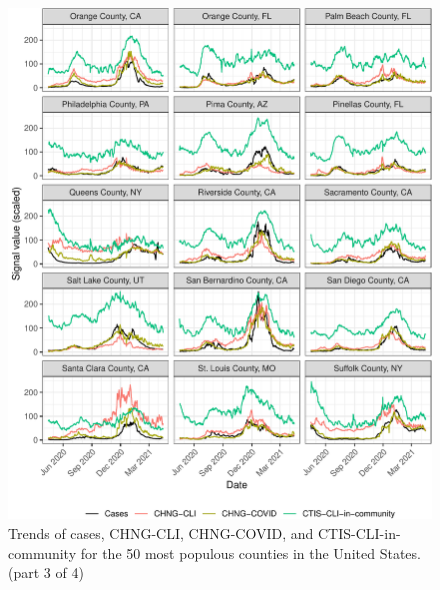 \documentclass[9pt,twoside,lineno]{pnas-new}
\begin{document}
\begin{figure}

{\centering \includegraphics[width=\textwidth]{fig/county-trend-grids-3-1} 

}

\caption{Trends of cases, CHNG-CLI, CHNG-COVID, and CTIS-CLI-in-community for the 50 most populous counties in the United States. (part 3 of 4)}\label{fig:county-trend-grids-3}
\end{figure}

\clearpage
\end{document}
